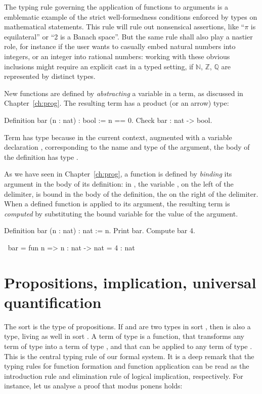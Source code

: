 The typing rule governing the application of functions to arguments is
a emblematic example of the strict well-formedness conditions enforced
by types on mathematical statements. This rule will rule out
nonsensical assertions, like ``$\pi$ is equilateral'' or ``2 is a
Banach space''. But the same rule shall also play a nastier role, for
instance if the user wants to casually embed natural numbers into
integers, or an integer into rational numbers: working with these
obvious inclusions might require an explicit cast in a typed setting,
if $\mathbb{N}$, $\mathbb{Z}$, $\mathbb{Q}$ are represented by
distinct types.


New functions are defined by \emph{abstracting} a variable in a term,
as discussed in Chapter~\ref{ch:prog}. The resulting term has a
product (or an arrow) type:

\begin{coq}{}{}
Definition bar (n : nat) : bool := 
  n == 0.
Check bar : nat -> bool.
\end{coq}

Term  has type  because in the current context,
augmented with a variable declaration , corresponding to
the name and type of the argument, the body  of the definition
 has type .

As we have seen in Chapter~\ref{ch:prog}, a function is defined by
\emph{binding} its argument in the body of its definition: in
, the variable , on the left of the \C{:=} delimiter, is
bound in the body of the definition, the  on the right of the \C{:=}
delimiter. When a defined function is applied to its argument, the
resulting term is \emph{computed} by substituting the bound variable
for the value of the argument.

\begin{coq-left}{}{}
Definition bar (n : nat) : nat := n.
Print bar.
Compute bar 4.
\end{coq-left}
\begin{coqout-right}
$~$
bar = fun n => n : nat -> nat
= 4 : nat
\end{coqout-right}


\section{Propositions, implication, universal quantification}\label{sec:propiuq}

The sort  is the type of propositions. If  and  are
two types in sort , then  is also a type, living as well in
sort . A term of type  is a function, that
transforms any term of type  into a term of type , and that
can be applied to any term of type . This is the central typing
rule of our formal system. It is a deep remark that the
typing rules for function formation and function application
can be read as the
introduction rule and elimination rule of logical implication,
respectively.
For instance, let us analyse a proof that modus ponens holds:

